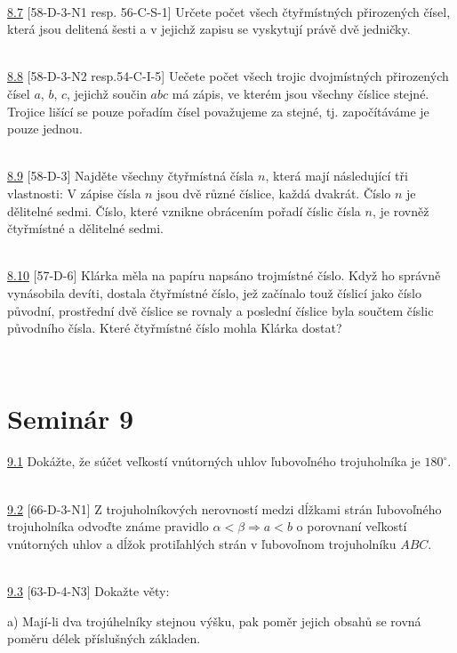 \\

\noindent \ul{8.7} [58-D-3-N1 resp. 56-C-S-1] Určete počet všech čtyřmístných přirozených čísel,
která jsou delitená šesti a v jejichž zapisu se vyskytují právě dvě jedničky.

\\

\noindent \ul{8.8} [58-D-3-N2 resp.54-C-I-5]  Uečete počet všech trojic dvojmístných přirozených
čísel $a$, $b$, $c$, jejichž součin $abc$ má zápis, ve kterém jsou všechny číslice stejné. Trojice
lišící se pouze pořadím čísel považujeme za stejné, tj. započítáváme je pouze jednou.


\\

\noindent \ul{8.9} [58-D-3] Najděte všechny čtyřmístná čísla $n$, která mají následující tři
vlastnosti: V zápise čísla $n$ jsou dvě různé číslice, každá dvakrát. Číslo $n$ je dělitelné sedmi.
Číslo, které vznikne obrácením pořadí číslic čísla $n$, je rovněž čtyřmístné a dělitelné sedmi.


\\

\noindent \ul{8.10} [57-D-6] Klárka měla na papíru napsáno trojmístné číslo. Když ho správně
vynásobila devíti, dostala čtyřmístné číslo, jež začínalo touž číslicí jako číslo původní,
prostřední dvě číslice se rovnaly a poslední číslice byla součtem číslic původního čísla. Které
čtyřmístné číslo mohla Klárka dostat?


\\

\section*{Seminár 9}

\noindent \ul{9.1} Dokážte, že súčet veľkostí vnútorných uhlov ľubovoľného trojuholníka je $180^\circ$.


\\

\noindent \ul{9.2} [66-D-3-N1] Z trojuholníkových nerovností medzi dĺžkami strán ľubovoľného trojuholníka odvoďte známe
pravidlo $\alpha < \beta \Rightarrow a < b$ o porovnaní veľkostí vnútorných uhlov a dĺžok protiľahlých strán v ľubovoľnom trojuholníku $ABC$.


\\

\noindent \ul{9.3} [63-D-4-N3] Dokažte věty:

a) Mají-li dva trojúhelníky stejnou výšku, pak poměr jejich obsahů se rovná poměru délek příslušných základen.

